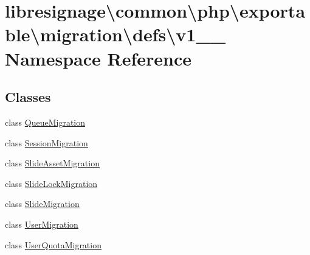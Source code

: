 \hypertarget{namespacelibresignage_1_1common_1_1php_1_1exportable_1_1migration_1_1defs_1_1v1__1__0}{}\section{libresignage\textbackslash{}common\textbackslash{}php\textbackslash{}exportable\textbackslash{}migration\textbackslash{}defs\textbackslash{}v1\+\_\+\_ Namespace Reference}
\label{namespacelibresignage_1_1common_1_1php_1_1exportable_1_1migration_1_1defs_1_1v1__1__0}
\subsection*{Classes}
\begin{DoxyCompactItemize}
\item 
class \hyperlink{classlibresignage_1_1common_1_1php_1_1exportable_1_1migration_1_1defs_1_1v1__1__0_1_1QueueMigration}{Queue\+Migration}
\item 
class \hyperlink{classlibresignage_1_1common_1_1php_1_1exportable_1_1migration_1_1defs_1_1v1__1__0_1_1SessionMigration}{Session\+Migration}
\item 
class \hyperlink{classlibresignage_1_1common_1_1php_1_1exportable_1_1migration_1_1defs_1_1v1__1__0_1_1SlideAssetMigration}{Slide\+Asset\+Migration}
\item 
class \hyperlink{classlibresignage_1_1common_1_1php_1_1exportable_1_1migration_1_1defs_1_1v1__1__0_1_1SlideLockMigration}{Slide\+Lock\+Migration}
\item 
class \hyperlink{classlibresignage_1_1common_1_1php_1_1exportable_1_1migration_1_1defs_1_1v1__1__0_1_1SlideMigration}{Slide\+Migration}
\item 
class \hyperlink{classlibresignage_1_1common_1_1php_1_1exportable_1_1migration_1_1defs_1_1v1__1__0_1_1UserMigration}{User\+Migration}
\item 
class \hyperlink{classlibresignage_1_1common_1_1php_1_1exportable_1_1migration_1_1defs_1_1v1__1__0_1_1UserQuotaMigration}{User\+Quota\+Migration}
\end{DoxyCompactItemize}
